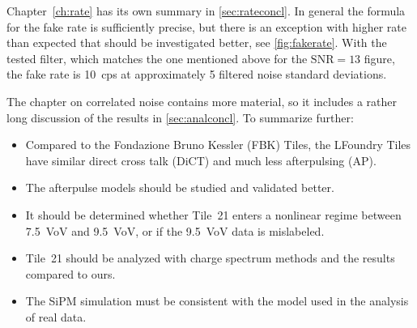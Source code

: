 
Chapter~\ref{ch:rate} has its own summary in \autoref{sec:rateconcl}. In
general the formula for the fake rate is sufficiently precise, but there is an
exception with higher rate than expected that should be investigated better,
see \autoref{fig:fakerate}. With the tested filter, which matches the one
mentioned above for the $\mathrm{SNR} = 13$ figure, the fake rate is
\SI{10}{cps} at approximately 5 filtered noise standard deviations.


The chapter on correlated noise contains more material, so it includes a rather
long discussion of the results in \autoref{sec:analconcl}. To summarize
further:

\begin{itemize}
    
    \item Compared to the Fondazione Bruno Kessler (FBK) Tiles, the LFoundry
    Tiles have similar direct cross talk (DiCT) and much less afterpulsing (AP).
    
    \item The afterpulse models should be studied and validated better.
    
    \item It should be determined whether Tile~21 enters a nonlinear regime
    between \SI{7.5}{VoV} and \SI{9.5}{VoV}, or if the \SI{9.5}{VoV} data is
    mislabeled.
    
    \item Tile~21 should be analyzed with charge spectrum methods and the
    results compared to ours.
    
    \item The SiPM simulation must be consistent with the model used in the
    analysis of real data.
    
\end{itemize}

